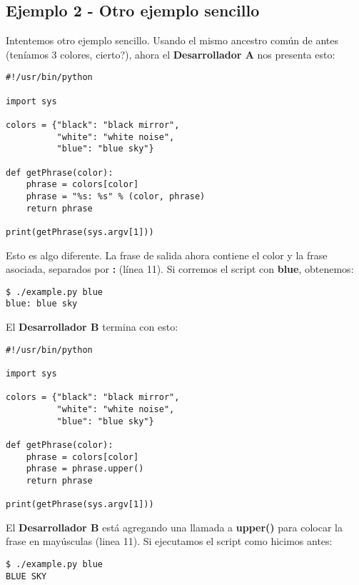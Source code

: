 
\subsection{Ejemplo 2 - Otro ejemplo sencillo}
\label{example_02}

Intentemos otro ejemplo sencillo. Usando el mismo ancestro común de antes (teníamos 3 colores, cierto?),
ahora el {\bf Desarrollador A} nos presenta esto:
\begin{lstlisting}[style=python_style, caption={\bf Ejemplo 2} - Desarrollador A]
#!/usr/bin/python

import sys

colors = {"black": "black mirror",
          "white": "white noise",
          "blue": "blue sky"}

def getPhrase(color):
    phrase = colors[color]
    phrase = "%s: %s" % (color, phrase)
    return phrase

print(getPhrase(sys.argv[1]))
\end{lstlisting}

Esto es algo diferente. La frase de salida ahora contiene el color y la frase asociada, separados por {\bf :} (línea 11).
Si corremos el script con {\bf blue}, obtenemos:
\begin{lstlisting}[style=console_style, caption={\bf Ejemplo 2} - Ejecutando el script del Desarrollador A]
$ ./example.py blue
blue: blue sky
\end{lstlisting}

El {\bf Desarrollador B} termina con esto:
\begin{lstlisting}[style=python_style, caption={\bf Ejemplo 2} - Desarrollador B]
#!/usr/bin/python

import sys

colors = {"black": "black mirror",
          "white": "white noise",
          "blue": "blue sky"}

def getPhrase(color):
    phrase = colors[color]
    phrase = phrase.upper()
    return phrase

print(getPhrase(sys.argv[1]))
\end{lstlisting}

El {\bf Desarrollador B} está agregando una llamada a {\bf upper()} para colocar la frase en mayúsculas (linea 11). Si ejecutamos el
script como hicimos antes:
\begin{lstlisting}[style=console_style, caption={\bf Ejemplo 2} - ejecutando el script del Desarrollador B]
$ ./example.py blue
BLUE SKY
\end{lstlisting}

